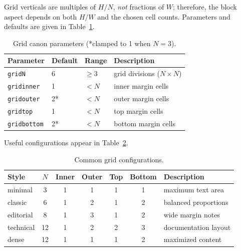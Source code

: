 \documentclass[11pt, twoside, openany]{book}
\begin{document}
Grid verticals are multiples of $H/N$, \emph{not} fractions of $W$; therefore, the block aspect depends on both $H/W$ and the chosen cell counts. Parameters and defaults are given in Table~\ref{tab:params}.

\begin{table}[h]
	\centering
	\caption{Grid canon parameters (*clamped to 1 when $N=3$).}
	\label{tab:params}
	\begin{tabular}{@{}llll@{}}
		\toprule
		\bfseries Parameter & \bfseries Default & \bfseries Range & \bfseries Description         \\
		\midrule
		\texttt{gridN}      & 6                 & $\geq 3$        & grid divisions ($N \times N$) \\
		\texttt{gridinner}  & 1                 & $< N$           & inner margin cells            \\
		\texttt{gridouter}  & 2*                & $< N$           & outer margin cells            \\
		\texttt{gridtop}    & 1                 & $< N$           & top margin cells              \\
		\texttt{gridbottom} & 2*                & $< N$           & bottom margin cells           \\
		\bottomrule
	\end{tabular}
\end{table}

Useful configurations appear in Table~\ref{tab:useful}.

\begin{table}[h]
	\centering
	\caption{Common grid configurations.}
	\label{tab:useful}
	\begin{tabular}{@{}lccccc l@{}}
		\toprule
		\bfseries Style & $N$ & \bfseries Inner & \bfseries Outer & \bfseries Top & \bfseries Bottom & \bfseries Description \\
		\midrule
		minimal         & 3   & 1               & 1               & 1             & 1                & maximum text area     \\
		classic         & 6   & 1               & 2               & 1             & 2                & balanced proportions  \\
		editorial       & 8   & 1               & 3               & 1             & 2                & wide margin notes     \\
		technical       & 12  & 1               & 2               & 2             & 3                & documentation layout  \\
		dense           & 12  & 1               & 1               & 1             & 2                & maximized content     \\
		\bottomrule
	\end{tabular}
\end{table}
\end{document}
